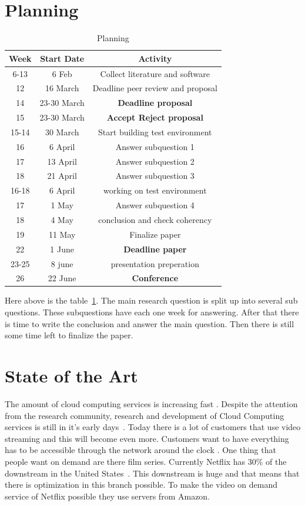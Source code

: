 \documentclass{sig-alternate-br}
\begin{document}
\section{Planning}

\begin{table}[H]
	\centering \caption{Planning}
\begin{tabular}{|c|c|c|} \hline
		\textbf{Week} & \textbf{Start Date} & \textbf{Activity} \\ \hline 
		6-13& 6 Feb& Collect literature and software\\ \hline 
		12& 16 March& Deadline peer review and proposal \\ \hline
		14& 23-30 March & \textbf{Deadline proposal} \\ \hline
		15 & 23-30 March &  \textbf{Accept Reject proposal} \\ \hline
		15-14& 30 March& Start building test environment \\ \hline
		16& 6 April & Answer subquestion 1  \\ \hline
		17& 13 April & Answer subquestion 2\\ \hline
		18& 21 April & Answer subquestion 3\\ \hline
		16-18 & 6 April  & working on test environment \\ \hline
		17& 1 May  & Answer subquestion 4 \\ \hline
		18& 4 May & conclusion and check coherency \\ \hline
		19& 11 May & Finalize paper \\ \hline
		22& 1 June &  \textbf{Deadline paper} \\ \hline
		23-25& 8 june & presentation preperation \\ \hline
		26 & 22 June & \textbf{Conference} \\ \hline
		\end{tabular}

		\label{tab:planning}
\end{table}
Here above is the table~\ref{tab:planning}. The main research question is split up into several sub questions. These subquestions have each one week for answering. After that there is time to write the conclusion and answer the main question. Then there is still some time left to finalize the paper. 

\section{State of the Art}
The amount of cloud computing services is increasing fast \cite{armbrust:2009}. Despite the attention
from the research community, research and development of
Cloud Computing services is still in it's early days~\cite{tso:2013}. Today there is a lot of customers that use video streaming and this will become even more. Customers want to have everything has to be accessible through the network around the clock \cite{youseff:2008}. One thing that people want on demand are there film series. Currently Netflix has 30\% of the downstream in the United States~\cite{computer-networking}. This downstream is huge and that means that there is optimization in this branch possible. To make the video on demand service of Netflix possible they use servers from Amazon. 
\end{document}
